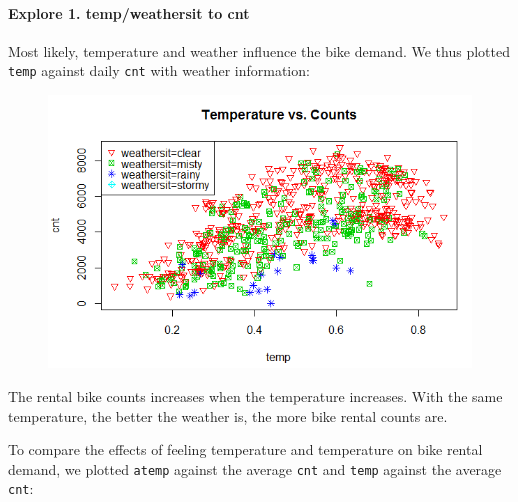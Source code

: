 \documentclass[12pt]{article}
\begin{document}
	\paragraph*{Explore 1. temp/weathersit to cnt} Most likely, temperature and weather influence the bike demand. We thus plotted \texttt{temp} against daily \texttt{cnt} with weather information:
	\begin{figure}[H]
		\centering
		\includegraphics[scale=.85]{figures/temp_counts.png}
	\end{figure}
	
	The rental bike counts increases when the temperature increases. With the same temperature, the better the weather is, the more bike rental counts are.
	
	To compare the effects of feeling temperature and temperature on bike rental demand, we plotted \texttt{atemp} against the average \texttt{cnt} and \texttt{temp} against the average \texttt{cnt}:
	
\end{document}
